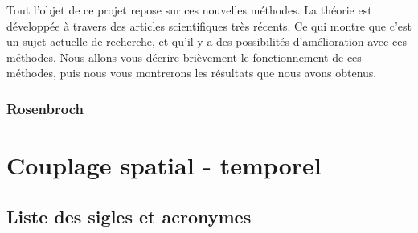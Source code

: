 \documentclass[a4paper,12pt]{report}
\makeatletter
\def\cleardoublepage{\clearpage\if@twoside \ifodd\c@page\else%
  \hbox{}%
  \thispagestyle{empty}%
  \newpage%
  \if@twocolumn\hbox{}\newpage\fi\fi\fi}
\theoremstyle{break}
\makeatother
\begin{document}
Tout l'objet de ce projet repose sur ces nouvelles méthodes. La théorie est développée à travers des articles scientifiques très récents. Ce qui montre que c'est un sujet actuelle de recherche, et qu'il y a des possibilités d'amélioration avec ces méthodes. Nous allons vous décrire brièvement le fonctionnement de ces méthodes, puis nous vous montrerons les résultats que nous avons obtenus.  
\section{Rosenbroch}

\part{Couplage spatial - temporel}
\clearpage
\listoffigures

\clearpage
\chapter*{Liste des sigles et acronymes}
\begin{acronym}[CP-OFDMX] %
\end{acronym}




%
%
%
%


%
%



\thispagestyle{empty}
\end{document}
